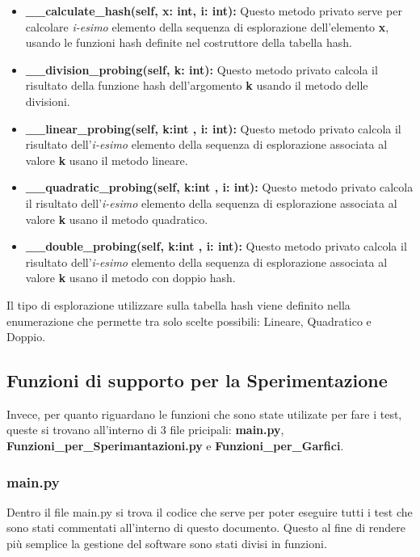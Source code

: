 \documentclass{article}
\newcommand{\newlineitem}[1]{\item \textbf{#1} \hfill \break}
\begin{document}
\begin{itemize}
\newlineitem{\_\_calculate\_hash(self, x: int, i: int):}
Questo metodo privato serve per calcolare \emph{i-esimo} elemento della sequenza di esplorazione dell'elemento \textbf{x}, usando le funzioni hash definite nel costruttore della tabella hash.
\newlineitem{\_\_division\_probing(self, k: int):}
Questo metodo privato calcola il risultato della funzione hash dell'argomento \textbf{k} usando il metodo delle divisioni.
\newlineitem{\_\_linear\_probing(self, k:int , i: int):}
Questo metodo privato calcola il risultato dell'\emph{i-esimo} elemento della sequenza di esplorazione associata al valore \textbf{k} usano il metodo lineare.
\newlineitem{\_\_quadratic\_probing(self, k:int , i: int):}
Questo metodo privato calcola il risultato dell'\emph{i-esimo} elemento della sequenza di esplorazione associata al valore \textbf{k} usano il metodo quadratico.
\newlineitem{\_\_double\_probing(self, k:int , i: int):}
Questo metodo privato calcola il risultato dell'\emph{i-esimo} elemento della sequenza di esplorazione associata al valore \textbf{k} usano il metodo con doppio hash.
\end{itemize}

Il tipo di esplorazione utilizzare sulla tabella hash viene definito nella enumerazione che permette tra solo scelte possibili: Lineare, Quadratico e Doppio.
\subsection{Funzioni di supporto per la Sperimentazione}
Invece, per quanto riguardano le funzioni che sono state utilizate per fare i test, queste si trovano all'interno di 3 file pricipali: \textbf{main.py}, \textbf{Funzioni\_per\_Sperimantazioni.py} e \textbf{Funzioni\_per\_Garfici}.

\subsubsection{main.py}
Dentro il file main.py si trova il codice che serve per poter eseguire tutti i test che sono stati commentati all'interno di questo documento. Questo al fine di rendere più semplice la gestione del software sono stati divisi in funzioni.
\end{document}
